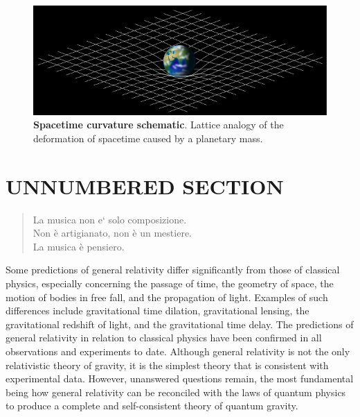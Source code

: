 \vfill\null

\begin{figure}[b]
\begin{center}
\includegraphics[width=.47\textwidth]{img/image1.png}
\caption{\textbf{Spacetime curvature schematic}. Lattice analogy of the deformation
of spacetime caused by a planetary mass.}
\label{gr01}
\end{center}
\end{figure}

\newpage %
\section*{UNNUMBERED SECTION}

\begin{quote}
La musica non e` solo composizione. \\
Non è artigianato, non è un mestiere. \\
La musica è pensiero. \cite{nono85}
\end{quote}

Some predictions of general relativity differ significantly from those of
classical physics, especially concerning the passage of time, the geometry of
space, the motion of bodies in free fall, and the propagation of light. Examples
of such differences include gravitational time dilation, gravitational lensing,
the gravitational redshift of light, and the gravitational time delay. The
predictions of general relativity in relation to classical physics have been
confirmed in all observations and experiments to date. Although general
relativity is not the only relativistic theory of gravity, it is the simplest
theory that is consistent with experimental data. However, unanswered questions
remain, the most fundamental being how general relativity can be reconciled with
the laws of quantum physics to produce a complete and self-consistent theory of
quantum gravity.

